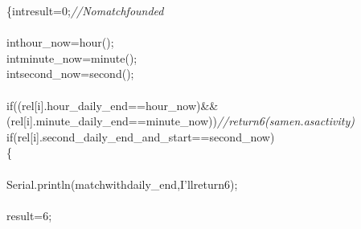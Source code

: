 \documentclass[a4paper, 12pt]{article}
\newcommand\SPC{\hspace*{0.6em}}
\newcommand\QOT{\mbox{\char 34}}
\newcommand{\CppAComment}[1]{\textit{\textcolor[rgb]{0.2,0.4,1}{#1}}}
\newcommand{\CppAIdentifier}[1]{\textcolor[rgb]{0,1,0}{#1}}
\newcommand{\CppANumber}[1]{\textcolor[rgb]{0,0,1}{#1}}
\newcommand{\CppAReservedWord}[1]{\textcolor[rgb]{0,0.5,0}{#1}}
\newcommand{\CppASpace}[1]{\textcolor[rgb]{1,1,1}{\colorbox[rgb]{0,0,0}{#1}}}
\newcommand{\CppAString}[1]{\textcolor[rgb]{0.76,0.76,0.76}{#1}}
\newcommand{\CppASymbol}[1]{\textcolor[rgb]{1,0,0}{#1}}
\begin{document}
\begin{ttfamily}
\CppASymbol{\{}\CppASpace{\SPC }\CppAReservedWord{int}\CppASpace{\SPC }\CppAIdentifier{result}\CppASymbol{=}\CppANumber{0}\CppASymbol{;}\CppASpace{\SPC }\CppAComment{//No\SPC match\SPC founded}\\
\\
\CppASpace{\SPC \SPC }\CppAReservedWord{int}\CppASpace{\SPC }\CppAIdentifier{hour\_now}\CppASpace{\SPC }\CppASymbol{=}\CppASpace{\SPC }\CppAIdentifier{hour}\CppASymbol{(}\CppASymbol{)}\CppASymbol{;}\\
\CppASpace{\SPC \SPC }\CppAReservedWord{int}\CppASpace{\SPC }\CppAIdentifier{minute\_now}\CppASpace{\SPC }\CppASymbol{=}\CppASpace{\SPC }\CppAIdentifier{minute}\CppASymbol{(}\CppASymbol{)}\CppASymbol{;}\\
\CppASpace{\SPC \SPC }\CppAReservedWord{int}\CppASpace{\SPC }\CppAIdentifier{second\_now}\CppASpace{\SPC }\CppASymbol{=}\CppASpace{\SPC }\CppAIdentifier{second}\CppASymbol{(}\CppASymbol{)}\CppASymbol{;}\\
\CppASpace{\SPC \SPC \SPC }\\
\CppASpace{\SPC \SPC \SPC }\CppAReservedWord{if}\CppASpace{\SPC }\CppASymbol{(}\CppASpace{\SPC }\CppASymbol{(}\CppAIdentifier{rel}\CppASymbol{[}\CppAIdentifier{i}\CppASymbol{]}\CppASymbol{.}\CppAIdentifier{hour\_daily\_end}\CppASymbol{==}\CppAIdentifier{hour\_now}\CppASymbol{)}\CppASpace{\SPC }\CppASymbol{\&\&}\CppASpace{\SPC }\CppASymbol{(}\CppAIdentifier{rel}\CppASymbol{[}\CppAIdentifier{i}\CppASymbol{]}\CppASymbol{.}\CppAIdentifier{minute\_daily\_end}\CppASymbol{==}\CppAIdentifier{minute\_now}\CppASymbol{)}\CppASpace{\SPC }\CppASymbol{)}\CppASpace{\SPC }\CppAComment{//return\SPC 6\SPC (same\SPC n.\SPC as\SPC activity)}\\
\CppASpace{\SPC \SPC \SPC \SPC }\CppAReservedWord{if}\CppASpace{\SPC }\CppASymbol{(}\CppASpace{\SPC }\CppAIdentifier{rel}\CppASymbol{[}\CppAIdentifier{i}\CppASymbol{]}\CppASymbol{.}\CppAIdentifier{second\_daily\_end\_and\_start}\CppASymbol{==}\CppAIdentifier{second\_now}\CppASymbol{)}\\
\CppASpace{\SPC \SPC \SPC \SPC }\CppASymbol{\{}\\
\\
\CppASpace{\SPC \SPC \SPC \SPC \SPC \SPC }\CppAIdentifier{Serial}\CppASymbol{.}\CppAIdentifier{println}\CppASymbol{(}\CppAString{\QOT \SPC match\SPC with\SPC daily\_end,\SPC I'll\SPC return\SPC 6\QOT }\CppASymbol{)}\CppASymbol{;}\\
\\
\CppASpace{\SPC \SPC \SPC \SPC \SPC \SPC }\CppAIdentifier{result}\CppASymbol{=}\CppANumber{6}\CppASymbol{;}\\

\end{ttfamily}
\end{document}
